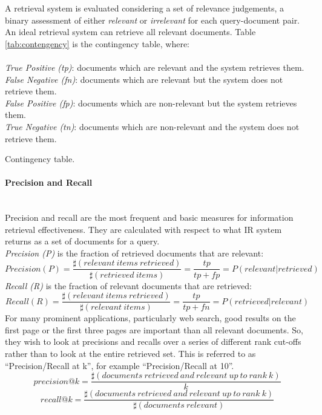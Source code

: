 A retrieval system is evaluated considering a set of relevance judgements, a binary assessment of either \textit{relevant} or \textit{irrelevant} for each query-document pair. An ideal retrieval system can retrieve all relevant documents. Table \ref{tab:contengency} is the contingency table, where:\\\\
\textit{True Positive (tp)}: documents which are relevant and the system retrieves them.\\
\textit{False Negative (fn)}: documents which are relevant but the system does not retrieve them. \\
\textit{False Positive (fp)}: documents which are non-relevant but the system retrieves them.\\
\textit{True Negative (tn)}: documents which are non-relevant and the system does not retrieve them. 
\begin{table*}[htpb]
  \centering
  
  \caption{Contingency table.}
  \label{tab:contengency}
\end{table*}
\FloatBarrier 
\paragraph{Precision and Recall}
\ \\
Precision and recall are the most frequent and basic measures for information retrieval effectiveness. They are calculated with respect to what IR system returns as a set of documents for a query.\\
\textit{Precision (P)} is the fraction of retrieved documents that are relevant:
\[
Precision (P)=\frac{\sharp(relevant \: items \: retrieved)}{\sharp(retrieved \: items)}=\frac{tp}{tp+fp}=P(relevant|retrieved)
\]
\textit{Recall (R)} is the fraction of relevant documents that are retrieved:
\[
Recall (R)=\frac{\sharp(relevant \: items \: retrieved)}{\sharp(relevant \: items)}=\frac{tp}{tp+fn}=P(retrieved|relevant)
\]
For many prominent applications, particularly web search, good results on the first page or the first three pages are important than all relevant documents. So, they wish to look at precisions and recalls over a series of different rank cut-offs rather than to look at the entire retrieved set. This is referred to as ``Precision/Recall at k'', for example ``Precision/Recall at 10''. 
\begin{equation}
precision@k=\frac{\sharp(documents \: retrieved \: and \: relevant \: up \: to \: rank \: k)}{k}
\end{equation}
\begin{equation}
recall@k=\frac{\sharp(documents \: retrieved \: and \: relevant \: up \: to \: rank \: k)}{\sharp(documents \: relevant)}
\end{equation}
